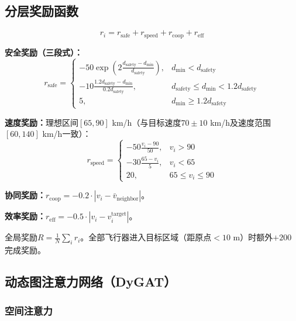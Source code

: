 \documentclass[12pt,a4paper,UTF8]{ctexart}
\begin{document}
\subsection{分层奖励函数}

\begin{equation}
    r_i = r_{\text{safe}} + r_{\text{speed}} + r_{\text{coop}} + r_{\text{eff}}
\end{equation}

\textbf{安全奖励（三段式）：}
\begin{equation}
    r_{\text{safe}} =
    \begin{cases}
        -50 \exp\!\left(2\frac{d_{\text{safety}} - d_{\min}}{d_{\text{safety}}}\right), & d_{\min} < d_{\text{safety}} \\[8pt]
        -10\frac{1.2d_{\text{safety}} - d_{\min}}{0.2d_{\text{safety}}}, & d_{\text{safety}} \leq d_{\min} < 1.2d_{\text{safety}} \\[8pt]
        5, & d_{\min} \geq 1.2d_{\text{safety}}
    \end{cases}
\end{equation}

\textbf{速度奖励：}理想区间$[65, 90]$ km/h（与目标速度$70\pm10$ km/h及速度范围$[60, 140]$ km/h一致）：
\begin{equation}
    r_{\text{speed}} =
    \begin{cases}
        -50\frac{v_i - 90}{50}, & v_i > 90 \\[8pt]
        -30\frac{65 - v_i}{5}, & v_i < 65 \\[8pt]
        20, & 65 \leq v_i \leq 90
    \end{cases}
\end{equation}

\textbf{协同奖励：}$r_{\text{coop}} = -0.2 \cdot |v_i - \bar{v}_{\text{neighbor}}|$。

\textbf{效率奖励：}$r_{\text{eff}} = -0.5 \cdot |v_i - v_i^{\text{target}}|$。

全局奖励$R = \frac{1}{N}\sum_i r_i$。全部飞行器进入目标区域（距原点$<10$ m）时额外$+200$完成奖励。

\subsection{动态图注意力网络（DyGAT）}

\subsubsection{空间注意力}
\end{document}
